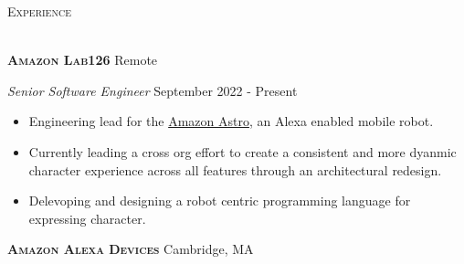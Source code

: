 \documentclass[a4paper]{article}
\newcommand{\lineunder} {
    \vspace*{-8pt} \\
    \hspace*{-18pt} \hrulefill \\
}
\newcommand{\header} [1] {
    {\hspace*{-18pt}\vspace*{6pt} \textsc{#1}}
    \vspace*{-6pt} \lineunder
    \vspace{2mm}
}
\begin{document}
\vspace{4mm}

\header{\faBriefcase \hspace{1pt} Experience}
\vspace{1mm}

\textbf{\textsc{Amazon Lab126}} \hfill Remote\\
\vspace{2mm}

\begin{addmargin}[1em]{0em}
    \textit{Senior Software Engineer} \hfill September 2022 - Present\\
    \vspace{-1mm}
    \begin{itemize} \itemsep 1pt
        \item Engineering lead for the \href{https://www.amazon.com/dp/B078NSDFSB}{Amazon Astro}, an Alexa enabled mobile robot.
        \item Currently leading a cross org effort to create a consistent and more dyanmic character experience
            across all features through an architectural redesign.
        \item Delevoping and designing a robot centric programming language for expressing character.  
    \end{itemize}

\end{addmargin}


\textbf{\textsc{Amazon Alexa Devices}} \hfill Cambridge, MA\\
\vspace{2mm}
\end{document}
